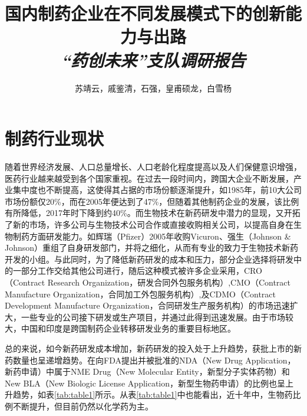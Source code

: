 \documentclass{apa6}
\title{\textbf{国内制药企业在不同发展模式下的创新能力与出路}\\{\textit{“药创未来”支队调研报告}}}
\author{苏靖云，戚鉴清，石强，皇甫硕龙，白雪杨}
\begin{document}
\maketitle

\section{制药行业现状}

随着世界经济发展、人口总量增长、人口老龄化程度提高以及人们保健意识增强，医药行业越来越受到各个国家重视。在过去一段时间内，跨国大企业不断发展，产业集中度也不断提高，这使得其占据的市场份额逐渐提升，如1985年，前10大公司市场份额仅20\%，而在2005年便达到了47\%\citep{RN7}，但随着其他制药企业的发展，该比例有所降低，2017年时下降到约40\%\citep{RN1}。而生物技术在新药研发中潜力的显现，又开拓了新的市场，许多公司与生物技术公司合作或直接收购相关公司，以提高自身在生物制药方面研发能力\citep{RN8}。如辉瑞（Pfizer）2005年收购Vicuron、强生（Johnson \& Johnson）重组了自身研发部门，并将之细化，从而有专业的致力于生物技术新药开发的小组。与此同时，为了降低新药研发的成本和压力，部分企业选择将研发中的一部分工作交给其他公司进行，随后这种模式被许多企业采用，CRO（Contract Research Organization，研发合同外包服务机构）,CMO（Contract Manufacture Organization，合同加工外包服务机构）,及CDMO（Contract Development Manufacture Organization，合同研发生产服务机构）的市场迅速扩大\citep{RN2}，一些专业的公司接下研发或生产项目，并通过此得到迅速发展。由于市场较大，中国和印度是跨国制药企业转移研发业务的重要目标地区\citep{RN7}。

总的来说，如今新药研发成本增加，新药研发的投入处于上升趋势，获批上市的新药数量也呈递增趋势\citep{RN6}。在向FDA提出并被批准的NDA（New Drug Application，新药申请）中属于NME Drug（New Molecular Entity，新型分子实体药物）和New BLA（New Biologic License Application，新型生物药申请）的比例也呈上升趋势，如表\ref{tab:table1}所示\citep{RN15,RN16,RN17,RN18}。从表\ref{tab:table1}中也能看出，近十年中，生物药比例不断提升，但目前仍然以化学药为主。
\end{document}

